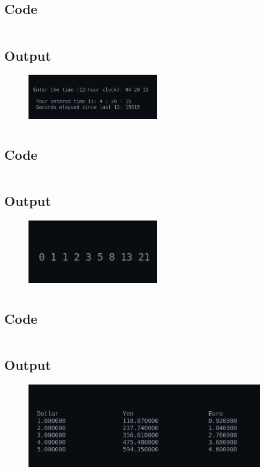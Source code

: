 \documentclass[12pt]{article}
\begin{document}
\subsection{Code}
\inputminted{c}{q2.c}
\subsection{Output}
\begin{figure}[h]
    \centering
    \includegraphics[width=0.5\textwidth]{2.png}
\end{figure}

\newpage
\section{}
\subsection{Code}
\inputminted{c}{q3.c}
\subsection{Output}
\begin{figure}[h]
    \centering
    \includegraphics[width=0.5\textwidth]{3.png}
\end{figure}

\newpage
\section{}
\subsection{Code}
\inputminted{c}{q4.c}
\subsection{Output}
\begin{figure}[h]
    \centering
    \includegraphics[width=0.9\textwidth]{4.png}
\end{figure}
\end{document}
